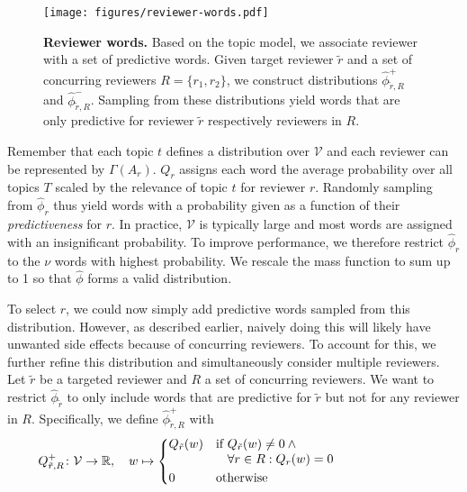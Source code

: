 \documentclass[letterpaper,twocolumn,10pt]{article}
\newcommand{\vocabulary}{\mathcal{V}}
\newcommand{\surroundingreviewers}{R}
\newcommand{\reviewer}{r}
\newcommand{\archive}{A}
\newcommand{\reviewerwordsmax}{\nu}
\newcommand{\reviewerwordsmass}{Q}
\newcommand{\reviewerwords}{\hat{\topicworddist}}
\newcommand{\topic}{t}
\newcommand{\topics}{T}
\newcommand{\topicextractor}{\Gamma}
\newcommand{\topicworddist}{\phi}
\newcommand{\word}{w}
\begin{document}
\begin{figure}[t]
    \centering
\texttt{[image: figures/reviewer-words.pdf]}
    \caption{\textbf{Reviewer words.} Based on the topic model, we associate reviewer with a set of predictive words. Given target reviewer $\tilde{\reviewer}$ and a set of concurring reviewers $\surroundingreviewers = \{\reviewer_1, \reviewer_2\}$, we construct distributions $\reviewerwords^+_{\tilde{\reviewer}, \surroundingreviewers}$ and $\reviewerwords^-_{\tilde{\reviewer}, \surroundingreviewers}$. Sampling from these distributions yield words that are only predictive for reviewer $\tilde{\reviewer}$ respectively reviewers in $\surroundingreviewers$. }
    \label{fig:reviewer-words}
  	\vspace{-0.5em}
\end{figure} 
Remember that each topic $\topic$ defines a distribution over $\vocabulary$ and each reviewer can be represented by $\topicextractor(\archive_\reviewer)$. $\reviewerwordsmass_\reviewer$ assigns each word the average probability over all topics $\topics$ scaled by the relevance of topic $\topic$ for reviewer $\reviewer$. 
Randomly sampling from $\reviewerwords_\reviewer$ thus yield words with a probability given as a function of their \emph{predictiveness} for $\reviewer$. In practice, $\vocabulary$ is typically large and most words are assigned with an insignificant probability. To improve performance, we therefore restrict $\reviewerwords_\reviewer$ to the $\reviewerwordsmax$ words with highest probability. We rescale the mass function to sum up to 1 so that $\reviewerwords$ forms a valid distribution.

To select $\reviewer$, we could now simply add predictive words sampled from this distribution. However, as described earlier, naively doing this will likely have unwanted side effects because of concurring reviewers.
To account for this, we further refine this distribution and simultaneously consider multiple reviewers. Let $\tilde{\reviewer}$ be a targeted reviewer and $\surroundingreviewers$ a set of concurring reviewers. We want to restrict $\reviewerwords_{\tilde{\reviewer}}$ to only include words that are predictive for $\tilde{\reviewer}$ but not for any reviewer in $\surroundingreviewers$. Specifically, we define $\reviewerwords^+_{\tilde{\reviewer}, \surroundingreviewers}$ with 
\[
    \reviewerwordsmass^+_{\tilde{\reviewer}, \surroundingreviewers} \colon \vocabulary \rightarrow \mathbb{R}, \quad \word \mapsto
    \begin{cases*}
        \reviewerwordsmass_{\tilde{\reviewer}}(w) &
        if \parbox[t]{5.5cm}{$\reviewerwordsmass_{\tilde{\reviewer}}(w) \neq 0 \wedge\\   
         \forall r \in \surroundingreviewers: \reviewerwordsmass_{\reviewer}(w) = 0$} \\
        0 & otherwise \\
    \end{cases*}    
\]
\end{document}
